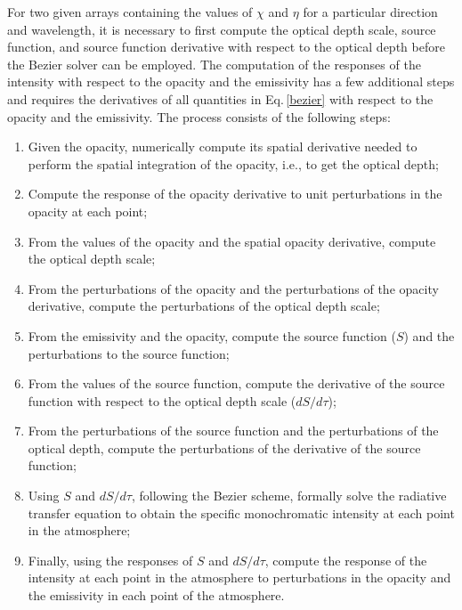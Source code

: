 \documentclass[referee]{aa}
\begin{document}
For two given arrays containing the values of $\chi$ and $\eta$ for a particular direction and wavelength, it is necessary to first compute the optical depth scale, source function, and source function derivative with respect to the optical depth before the Bezier solver can be employed. The computation of the responses of the intensity with respect to the opacity and the emissivity has a few additional steps and requires the derivatives of all quantities in Eq.\,\ref{bezier} with respect to the opacity and the emissivity. The process consists of the following steps:
\begin{enumerate}
 \item Given the opacity, numerically compute its spatial derivative needed to perform the spatial integration of the opacity, i.e., to get the optical depth;
 \item Compute the response of the opacity derivative to unit perturbations in the opacity at each point;
 \item From the values of the opacity and the spatial opacity derivative, compute the optical depth scale; 
 \item From the perturbations of the opacity and the perturbations of the opacity derivative, compute the perturbations of the optical depth scale; 
 \item From the emissivity and the opacity, compute the source function ($S$) and the perturbations to the source function;
 \item From the values of the source function, compute the derivative of the source function with respect to the optical depth scale ($dS/d\tau$);
 \item From the perturbations of the source function and the perturbations of the optical depth, compute the perturbations of the derivative of the source function;
 \item Using $S$ and $dS/d\tau$, following the Bezier scheme, formally solve the radiative transfer equation to obtain the specific monochromatic intensity at each point in the atmosphere;
 \item Finally, using the responses of $S$ and $dS/d\tau$, compute the response of the intensity at each point in the atmosphere to perturbations in the opacity and the emissivity in each point of the atmosphere. 
\end{enumerate}
\end{document}
